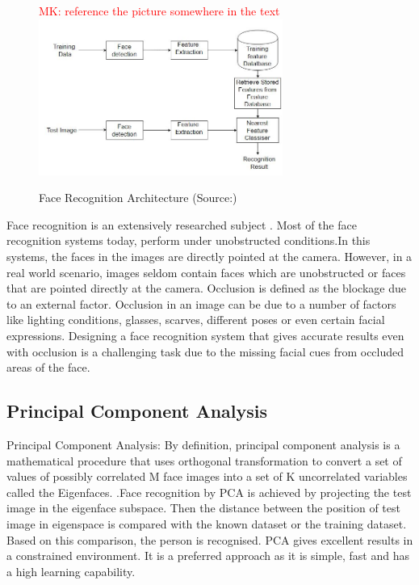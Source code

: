 \documentclass[conference]{IEEEtran}
\newcommand{\MK}[1]{\textcolor{red}{MK: #1}}  %
\begin{document}
\begin{figure}[h!]
\MK{reference the picture somewhere in the text}
 \centering
 \includegraphics[width = 8cm]{Face_Recognition_Architecture.JPG}
 \caption{ Face Recognition Architecture (Source:\cite{makwana_makwana_2016})}
 \label{fig 1: face recognition architecture}
\end{figure}

Face recognition is an extensively researched subject\cite{zhao2003face} \cite{abate20072d}.  Most of the face recognition systems today, perform under unobstructed conditions\cite{phillips2005overview}.In this systems, the faces in the images are directly pointed at the camera. However, in a real world scenario, images seldom contain faces which are unobstructed or  faces that are pointed directly at the camera. Occlusion is defined as the blockage due to an external factor. Occlusion in an image can be due to a number of factors like lighting conditions, glasses, scarves, different poses or even certain facial expressions. Designing a face recognition system that gives accurate results even with occlusion is a challenging task due to the missing facial cues from occluded areas of the face.

\subsection{Principal Component Analysis}
\label{subsec: 1a.Principal Component Analysis}
Principal Component Analysis: By definition, principal component analysis is a mathematical procedure that uses orthogonal transformation to convert a set of values of possibly correlated M face images into a set of K uncorrelated variables called the Eigenfaces.
\cite{turk1991face}.Face recognition by PCA is achieved by projecting the test image in the eigenface subspace. Then the distance between the position of test image in eigenspace is compared with the known dataset or the training dataset. Based on this comparison, the person is recognised. PCA gives excellent results in a constrained environment. It is a preferred approach as it is simple, fast and has a high learning capability.
\end{document}
